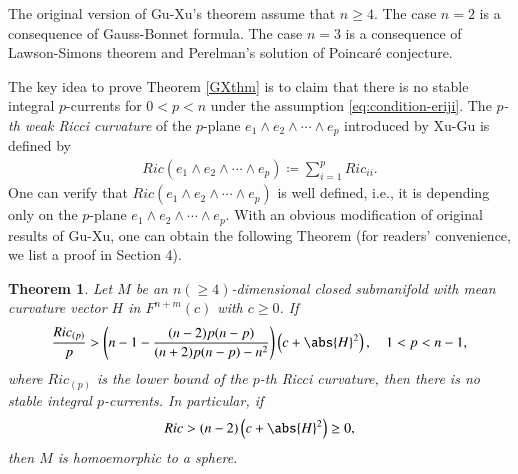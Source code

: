 \documentclass[12pt]{amsart}
\theoremstyle{plain}
\newtheorem{known}{Theorem}
\theoremstyle{remark}
\theoremstyle{definition}
\numberwithin{equation}{section}
\begin{document}
The original version of Gu-Xu's theorem assume that $n\geq4$. The case $n=2$ is a consequence of Gauss-Bonnet formula. The case $n=3$ is a consequence of Lawson-Simons theorem and Perelman's solution of Poincar\'{e} conjecture.

The key idea to prove Theorem \ref{GXthm} is to claim that there is no
stable integral $p$-currents for $0<p<n$ under the assumption \eqref{eq:condition-eriji}. The {\it $p$-th weak Ricci curvature} of the $p$-plane $e_1\wedge e_2\wedge\dotsm\wedge e_p$ introduced by Xu-Gu\cite{GuXu12} is defined by
\begin{align*}
Ric(e_1\wedge e_2\wedge\dotsm\wedge e_p)\coloneqq\sum_{i=1}^pRic_{ii}.
\end{align*}
One can verify that $Ric(e_1\wedge e_2\wedge\dotsm\wedge e_p)$ is well defined, i.e., it is depending only on the $p$-plane $e_1\wedge e_2\wedge\dotsm\wedge e_p$. With an obvious modification of original results of Gu-Xu\cite{XuLenGu14,XuGu13}, one can obtain the following Theorem (for readers' convenience, we list a proof in Section 4).
\begin{known}\cite{XuLenGu14,XuGu13}\label{gclaim}
Let $M$ be an $n(\geq4)$-dimensional closed submanifold  with mean curvature vector $H$  in $F^{n+m}(c)$ with $c\geq0$.
If
\begin{align*}
\dfrac{Ric_{(p)}}{p}>\left(n-1-\dfrac{(n-2)p(n-p)}{(n+2)p(n-p)-n^2}\right)\left(c+\abs{H}^2\right),\quad 1<p<n-1,
\end{align*}
where $Ric_{(p)}$ is the lower bound of the $p$-th Ricci curvature, then there is no stable integral $p$-currents.
In particular, if
\begin{align*}
Ric>(n-2)\left(c+\abs{H}^2\right)\geq0,
\end{align*}
then $M$ is homoemorphic to a sphere.
\end{known}
\end{document}
